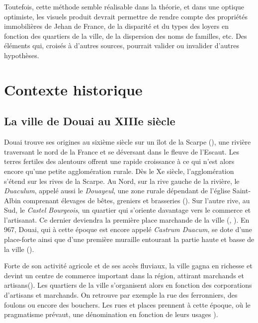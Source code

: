 Toutefois, cette méthode semble réalisable dans la théorie, et dans une optique optimiste,  les visuels produit devrait permettre de rendre compte des propriétés immobilières de Jehan de France, de la disparité et du types des loyers en fonction des quartiers de la ville, de la dispersion des noms de familles, etc. Des éléments qui, croisés  à d'autres sources, pourrait valider ou invalider d'autres hypothèses. 

\section{Contexte historique}
\subsection{La ville de Douai au XIIIe siècle}

Douai trouve ses origines au sixième siècle sur un îlot de la Scarpe (\cite{mestayer_douai_2016}), une rivière traversant le nord de la France et se déversant dans le fleuve de l'Escaut. Les terres fertiles des alentours offrent une rapide croissance à ce qui n'est alors encore qu'une petite agglomération rurale. Dès le Xe siècle, l'agglomération s'étend sur les rives de la Scarpe. Au Nord, sur la rive gauche de la rivière, le \textit{Duaculum}, appelé aussi le \textit{Douayeul}, une zone rurale dépendant de l'église Saint-Albin comprenant élevages de bêtes, greniers et brasseries (\cite{mestayer_douai_2016}). Sur l'autre rive, au Sud, le \textit{Castel Bourgeois}, un quartier qui s'oriente davantage vers le commerce et l'artisanat. Ce dernier deviendra la première place marchande de la ville (\cite{officedutourisme_douai_2016}, \cite{netteghem_histoire_2021}). En 967, Douai, qui à cette époque est encore appelé \textit{Castrum Duacum}, se dote d'une place-forte ainsi que d'une première muraille entourant la partie haute et basse de la ville (\cite{mestayer_douai_2016}). 

Forte de son activité agricole et de ses accès fluviaux, la ville gagna en richesse et devint un centre de commerce important dans la région, attirant marchands et artisans(\cite{clisant_vie_2003}). Les quartiers de la ville s'organisent alors en fonction des corporations d'artisans et marchands. On retrouve par exemple la rue des ferronniers, des foulons ou encore des bouchers. Les rues et places prennent à cette époque, où le pragmatisme  prévaut, une dénomination en fonction de leurs usages \cite{colin_decouvrez_2001}). 

